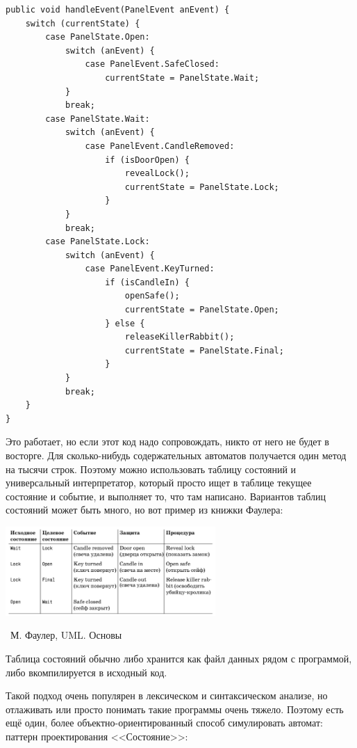 \documentclass[a5paper]{article}
\newcommand{\attribution}[1] {
	\vspace{-5mm}\begin{flushright}\begin{scriptsize}%
	{\textcopyright\, #1}\end{scriptsize}\end{flushright}
}
\begin{document}
\begin{verbatim}
public void handleEvent(PanelEvent anEvent) {
    switch (currentState) {
        case PanelState.Open:
            switch (anEvent) {
                case PanelEvent.SafeClosed:
                    currentState = PanelState.Wait;
            }
            break;
        case PanelState.Wait:
            switch (anEvent) {
                case PanelEvent.CandleRemoved:
                    if (isDoorOpen) {
                        revealLock();
                        currentState = PanelState.Lock;
                    }
            }
            break;
        case PanelState.Lock:
            switch (anEvent) {
                case PanelEvent.KeyTurned:
                    if (isCandleIn) {
                        openSafe();
                        currentState = PanelState.Open;
                    } else {
                        releaseKillerRabbit();
                        currentState = PanelState.Final;
                    }
            }
            break;
    }
}
\end{verbatim}

Это работает, но если этот код надо сопровождать, никто от него не будет в восторге. Для сколько-нибудь содержательных автоматов получается один метод на тысячи строк. Поэтому можно использовать таблицу состояний и универсальный интерпретатор, который просто ищет в таблице текущее состояние и событие, и выполняет то, что там написано. Вариантов таблиц состояний может быть много, но вот пример из книжки Фаулера:

\begin{center}
	\includegraphics[width=0.6\textwidth]{stateTransitionStateTable.png}
	\attribution{М. Фаулер, UML. Основы}
\end{center}

Таблица состояний обычно либо хранится как файл данных рядом с программой, либо вкомпилируется в исходный код. 

Такой подход очень популярен в лексическом и синтаксическом анализе, но отлаживать или просто понимать такие программы очень тяжело. Поэтому есть ещё один, более объектно-ориентированный способ симулировать автомат: паттерн проектирования <<Состояние>>:
\end{document}
